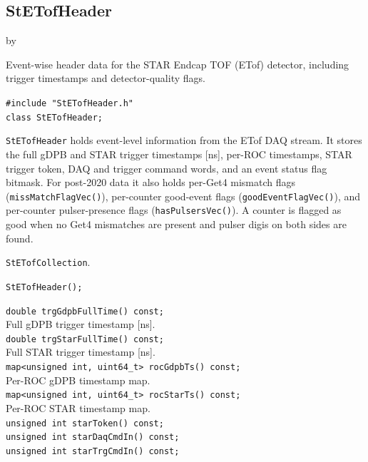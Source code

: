 \documentclass[twoside]{article}
\newcommand{\entrylabel}[1]{\mbox{\textbf{{#1}}}\hfil}%
\newenvironment{entry}
{\begin{list}{}%
    {\renewcommand{\makelabel}{\entrylabel}%
     \setlength{\labelwidth}{90pt}%
     \setlength{\leftmargin}{\labelwidth}
     \advance\leftmargin by \labelsep%
      }%
    }%
  {\end{list}}
\newcommand{\Entrylabel}[1]%
{\raisebox{0pt}[1ex][0pt]{\makebox[\labelwidth][l]%
    {\parbox[t]{\labelwidth}{\hspace{0pt}\textbf{{#1}}}}}}
\newenvironment{Entry}%
{\renewcommand{\entrylabel}{\Entrylabel}\begin{entry}}%
  {\end{entry}}
\begin{document}
\subsection{StETofHeader}
\label{sec:StETofHeader}
\begin{Entry}
\item[Summary] Event-wise header data for the STAR Endcap TOF (ETof)
    detector, including trigger timestamps and detector-quality flags.
\item[Synopsis]
    \verb+#include "StETofHeader.h"+\\
    \verb+class StETofHeader;+\\
\item[Description]
    \texttt{StETofHeader} holds event-level information from the ETof DAQ
    stream.  It stores the full gDPB and STAR trigger timestamps [ns], per-ROC
    timestamps, STAR trigger token, DAQ and trigger command words, and an
    event status flag bitmask.  For post-2020 data it also holds per-Get4
    mismatch flags (\verb+missMatchFlagVec()+), per-counter good-event flags
    (\verb+goodEventFlagVec()+), and per-counter pulser-presence flags
    (\verb+hasPulsersVec()+).  A counter is flagged as good when no Get4
    mismatches are present and pulser digis on both sides are found.
\item[Related Classes]
    \texttt{StETofCollection}.
\item[Public\\ Constructors]
    \verb+StETofHeader();+\\
\item[Public Member\\ Functions]
    \verb+double trgGdpbFullTime() const;+\\
    Full gDPB trigger timestamp [ns].\\
    \verb+double trgStarFullTime() const;+\\
    Full STAR trigger timestamp [ns].\\
    \verb+map<unsigned int, uint64_t> rocGdpbTs() const;+\\
    Per-ROC gDPB timestamp map.\\
    \verb+map<unsigned int, uint64_t> rocStarTs() const;+\\
    Per-ROC STAR timestamp map.\\
    \verb+unsigned int starToken() const;+\\
    \verb+unsigned int starDaqCmdIn() const;+\\
    \verb+unsigned int starTrgCmdIn() const;+\\

\end{Entry}
\end{document}
